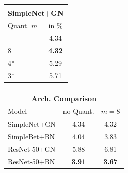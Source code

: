 \begin{table}[t]
	\centering
	\caption{\textbf{Quantization-Aware Training Accuracies.} Clean \TE for $m = 8$ bits or lower using our robust fixed-point quantization. We obtain competitive performance for $m = 8$ and $m = 4$ bits. On \CifarH, a Wide ResNet (WRN) clearly outperforms our standard SimpleNet model. Batch normalization (BN), improving \TE slightly on \CifarT, is significantly less robust than group normalization (GN), \cf {}. * For $m \leq 4$, we report results with weight clipping, \Clipping[$0.1$].}
	\label{tab:supp-accuracy}
	\vspace*{-0.25cm}
	\hspace*{-0.25cm}
	\begin{subfigure}[t]{0.19\textwidth}
		\vspace*{0px}
		\small
		\begin{tabular}{|@{\hskip 4px}l@{\hskip 4px}|@{\hskip 4px}c@{\hskip 4px}|}
			\multicolumn{2}{c}{\bfseries \CifarT}\\
			\multicolumn{2}{c}{\bfseries SimpleNet+GN}\\
			\hline
			Quant. $m$ & \TE in \%\\
			\hline
			-- & 4.34\\
			8 & \bfseries 4.32\\
			4* & 5.29\\
			3* & 5.71\\
			\hline
		\end{tabular}
	\end{subfigure}
	\begin{subfigure}[t]{0.28\textwidth}
		\vspace*{0px}
		\small
		\begin{tabular}{|@{\hskip 4px}l@{\hskip 4px}|@{\hskip 4px}c@{\hskip 4px}|@{\hskip 4px}c@{\hskip 4px}|}
			\multicolumn{3}{c}{\bfseries \CifarT}\\
			\multicolumn{3}{c}{\bfseries Arch. Comparison}\\
			\hline
			Model & no Quant. & $m = 8$\\
			\hline
			SimpleNet+GN & 4.34 & 4.32\\
			SimpleBet+BN & 4.04 & 3.83\\
			ResNet-50+GN & 5.88 & 6.81\\
			ResNet-50+BN & \bfseries 3.91 & \bfseries 3.67\\
			\hline
		\end{tabular}
	\end{subfigure}\\[4px]
	

\end{table}
